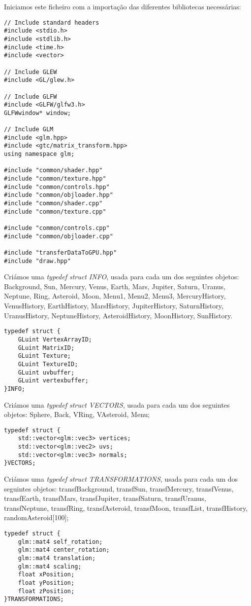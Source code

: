 Iniciamos este ficheiro com a importação das diferentes bibliotecas necessárias:
\begin{lstlisting}[caption=\textit{Includes} das bibliotecas usadas.]
// Include standard headers
#include <stdio.h>
#include <stdlib.h>
#include <time.h>
#include <vector>

// Include GLEW
#include <GL/glew.h>

// Include GLFW
#include <GLFW/glfw3.h>
GLFWwindow* window;

// Include GLM
#include <glm.hpp>
#include <gtc/matrix_transform.hpp>
using namespace glm;

#include "common/shader.hpp"
#include "common/texture.hpp" 
#include "common/controls.hpp" 
#include "common/objloader.hpp"
#include "common/shader.cpp"
#include "common/texture.cpp" 

#include "common/controls.cpp" 
#include "common/objloader.cpp"

#include "transferDataToGPU.hpp"
#include "draw.hpp"
\end{lstlisting}



Criámos uma \textit{typedef struct INFO}, usada para cada um dos seguintes objetos: Background, Sun, Mercury, Venus, Earth, Mars, Jupiter, Saturn, Uranus, Neptune, Ring, Asteroid, Moon, Menu1, Menu2, Menu3, MercuryHistory, VenusHistory, EarthHistory, MarsHistory, JupiterHistory, SaturnHistory, UranusHistory, NeptuneHistory, AsteroidHistory, MoonHistory, SunHistory.
\begin{lstlisting}[caption= \textit{typedef struct INFO}.]
typedef struct {
	GLuint VertexArrayID;
	GLuint MatrixID;
	GLuint Texture;
	GLuint TextureID;
	GLuint uvbuffer;
	GLuint vertexbuffer;
}INFO;
\end{lstlisting}

Criámos uma \textit{typedef struct VECTORS}, usada para cada um dos seguintes objetos: Sphere, Back, VRing, VAsteroid, Menu;
\begin{lstlisting}[caption= \textit{typedef struct VECTORS}.]
typedef struct {
	std::vector<glm::vec3> vertices;
	std::vector<glm::vec2> uvs;
	std::vector<glm::vec3> normals;
}VECTORS;
\end{lstlisting}

Criámos uma \textit{typedef struct TRANSFORMATIONS}, usada para cada um dos seguintes objetos: transfBackground, transfSun, transfMercury, transfVenus, transfEarth, transfMars, transfJupiter, transfSaturn, transfUranus, transfNeptune, transfRing, transfAsteroid, transfMoon, transfList, transfHistory, randomAsteroid[100];
\begin{lstlisting}[caption= \textit{typedef struct TRANSFORMATIONS}.]
typedef struct {
	glm::mat4 self_rotation;
	glm::mat4 center_rotation;
	glm::mat4 translation;
	glm::mat4 scaling;
	float xPosition;
	float yPosition;
	float zPosition;
}TRANSFORMATIONS;
\end{lstlisting}

